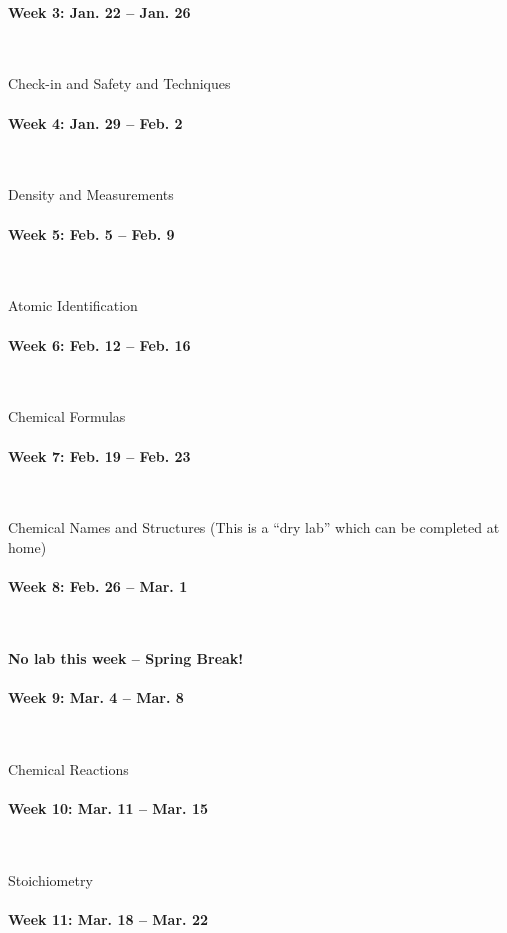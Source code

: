 \documentclass[12pt, letterpaper]{article}
\begin{document}
\paragraph{Week 3: Jan. 22 -- Jan. 26}~

Check-in and Safety and Techniques

\paragraph{Week 4: Jan. 29 -- Feb. 2}~

Density and Measurements

\paragraph{Week 5: Feb. 5 -- Feb. 9}~

Atomic Identification

\paragraph{Week 6: Feb. 12 -- Feb. 16}~

Chemical Formulas

\paragraph{Week 7: Feb. 19 -- Feb. 23}~

Chemical Names and Structures (This is a ``dry lab'' which can be completed at home)

\paragraph{Week 8: Feb. 26 -- Mar. 1}~

\textbf{No lab this week -- Spring Break!}

\paragraph{Week 9: Mar. 4 -- Mar. 8}~

Chemical Reactions

\paragraph{Week 10: Mar. 11 -- Mar. 15}~

Stoichiometry

\paragraph{Week 11: Mar. 18 -- Mar. 22}~
\end{document}
